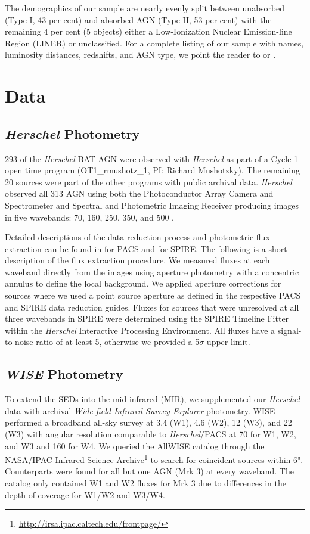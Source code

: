 \documentclass[fleqn, usenatbib]{mnras}
\newcommand{\herschel}{\emph{Herschel}}
\begin{document}
The demographics of our sample are nearly evenly split between unabsorbed (Type I, 43 per cent) and absorbed AGN (Type II, 53 per cent) with the remaining 4 per cent (5 objects) either a Low-Ionization Nuclear Emission-line Region (LINER) or unclassified. For a complete listing of our sample with names, luminosity distances, redshifts, and AGN type, we point the reader to \citet{Melendez:2014yu} or \citet{Shimizu:2016qy}.

\section{Data}
\subsection{\herschel{} Photometry}
293 of the \herschel{}-BAT AGN were observed with \herschel{} \citep{Pilbratt:2010rz} as part of a Cycle 1 open time program (OT1\_rmushotz\_1, PI: Richard Mushotzky). The remaining 20 sources were part of the other programs with public archival data. \herschel{} observed all 313 AGN using both the Photoconductor Array Camera and Spectrometer \citep[PACS;][]{Poglitsch:2010fp} and Spectral and Photometric Imaging Receiver \citep[SPIRE;][]{Griffin:2010sf} producing images in five wavebands: 70, 160, 250, 350, and 500 \micron.

Detailed descriptions of the data reduction process and photometric flux extraction can be found in \citet{Melendez:2014yu} for PACS and \citet{Shimizu:2016qy} for SPIRE. The following is a short description of the flux extraction procedure. We measured fluxes at each waveband directly from the images using aperture photometry with a concentric annulus to define the local background. We applied aperture corrections for sources where we used a point source aperture as defined in the respective PACS and SPIRE data reduction guides. Fluxes for sources that were unresolved at all three wavebands in SPIRE were determined using the SPIRE Timeline Fitter within the \herschel{} Interactive Processing Environment. All fluxes have a signal-to-noise ratio of at least 5, otherwise we provided a 5$\sigma$ upper limit. 

\subsection{\textit{WISE} Photometry}
To extend the SEDs into the mid-infrared (MIR), we supplemented our \herschel{} data with archival \textit{Wide-field Infrared Survey Explorer} \citep[WISE;][]{Wright:2010fk} photometry. WISE performed a broadband all-sky survey at 3.4 (W1), 4.6 (W2), 12 (W3), and 22 (W3) \micron{} with angular resolution comparable to \herschel/PACS at 70 \micron{} for W1, W2, and W3 and 160 \micron{} for W4. We queried the AllWISE catalog through the NASA/IPAC Infrared Science Archive\footnote{\url{http://irsa.ipac.caltech.edu/frontpage/}} to search for coincident sources within 6". Counterparts were found for all but one AGN (Mrk 3) at every waveband. The catalog only contained W1 and W2 fluxes for Mrk 3 due to differences in the depth of coverage for W1/W2 and W3/W4.
\end{document}
